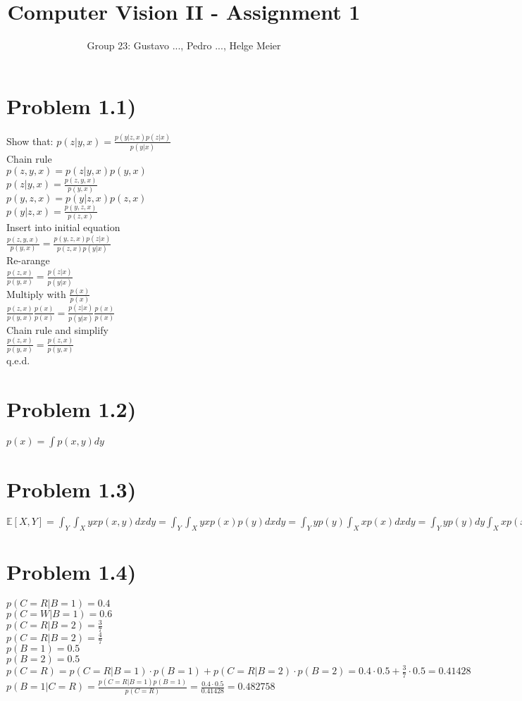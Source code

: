 \documentclass[11pt]{article} %
\title{Computer Vision II - Assignment 1}
\author{Group 23: Gustavo ..., Pedro ..., Helge Meier }
\date{}
\begin{document}
	\maketitle
	
	\section*{Problem 1.1)}
	Show that: $p(z \lvert y,x) = \frac{p(y \lvert z,x)p(z \lvert x)}{p(y \lvert x)}$\\
	Chain rule\\
	$p(z,y,x) = p(z \lvert y,x) p(y,x)$\\
	$p(z \lvert y,x) = \frac{p(z,y,x)}{p(y,x)} $\\
	$p(y,z,x) = p(y \lvert z,x) p(z,x)$\\
	$p(y \lvert z,x) = \frac{p(y,z,x)}{p(z,x)} $\\
	Insert into initial equation\\
	$\frac{p(z,y,x)}{p(y,x)}  = \frac{p(y,z,x)p(z \lvert x)}{p(z,x) p(y \lvert x)} $\\
	Re-arange\\
	$\frac{p(z,x)}{p(y,x)}  = \frac{p(z \lvert x)}{p(y \lvert x)} $\\
	Multiply with $\frac{p(x)}{p(x)}$\\
	$\frac{p(z,x)}{p(y,x)}\frac{p(x)}{p(x)}  = \frac{p(z \lvert x)}{p(y \lvert x)}\frac{p(x)}{p(x)} $\\
	Chain rule and simplify\\
	$\frac{p(z,x)}{p(y,x)}  = \frac{p(z , x)}{p(y , x)} $\\
	q.e.d.
	\section*{Problem 1.2)}
	$p(x) = \int p(x,y) dy$
	\section*{Problem 1.3)}
	$\mathbb{E}\left[X,Y\right] = \int_{Y} \int_{X} yxp(x,y) dxdy = \int_{Y} \int_{X} yxp(x)p(y) dxdy = \int_{Y} yp(y) \int_{X} xp(x) dxdy = \int_{Y} yp(y) dy\int_{X} xp(x) dx = \mathbb{E}\left[Y\right]\mathbb{E}\left[X\right]$\\
	\section*{Problem 1.4)}
	$p(C=R \lvert B=1) = 0.4$\\
	$p(C=W \lvert B=1) = 0.6$\\
	$p(C=R \lvert B=2) = \frac{3}{7}$\\
	$p(C=R \lvert B=2) = \frac{4}{7}$\\
	$p(B=1) = 0.5$\\
	$p(B=2) = 0.5$\\
	$p(C=R) = p(C=R \lvert B=1) \cdot p(B=1) + p(C=R \lvert B=2) \cdot p(B=2) = 0.4 \cdot 0.5 + \frac{3}{7}\cdot 0.5 = 0.41428$\\
	$p(B=1 \lvert C=R) = \frac{p(C=R \lvert B=1)p(B=1)}{p(C=R)} = \frac{0.4 \cdot 0.5}{0.41428} = 0.482758$\\
\end{document}
